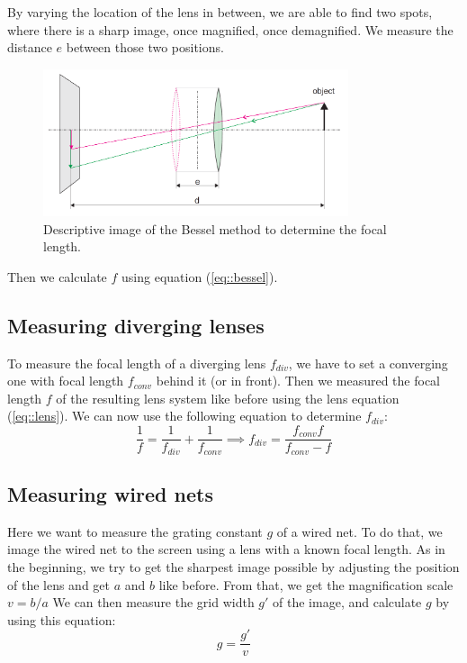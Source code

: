 By varying the location of the lens in between, we are able to find two spots, where there is a sharp image, once magnified, once demagnified.
We measure the distance $e$ between those two positions.
\begin{figure}[h!]
	\centering
	\includegraphics[width=0.8\textwidth]{img/bessel.PNG}
	\caption{Descriptive image\cite{manual} of the Bessel method to determine the focal length.}
	\label{fig::bessel}
\end{figure}
 Then we calculate $f$ using equation (\ref{eq::bessel}).


\subsection{Measuring diverging lenses}
\label{chap::div}
To measure the focal length of a diverging lens $f_{div}$, we have to set a converging one with focal length $f_{conv}$ behind it (or in front). 
Then we measured the focal length $f$ of the resulting lens system like before using the lens equation (\ref{eq::lens}).
We can now use the following equation to determine $f_{div}$:
\begin{equation}
	\frac{1}{f} = \frac{1}{f_{div}} + \frac{1}{f_{conv}} \implies f_{div} = \frac{f_{conv} f}{f_{conv} - f}
	\label{eq::div}
\end{equation}


\subsection{Measuring wired nets}
Here we want to measure the grating constant $g$ of a wired net.
To do that, we image the wired net to the screen using a lens with a known focal length.
As in the beginning, we try to get the sharpest image possible by adjusting the position of the lens and get $a$ and $b$ like before.
From that, we get the magnification scale $v = b/a$
We can then measure the grid width $g'$ of the image, and calculate $g$ by using this equation:
\begin{equation}
	g = \frac{g'}{v}
	\label{eq::grid}
\end{equation}

